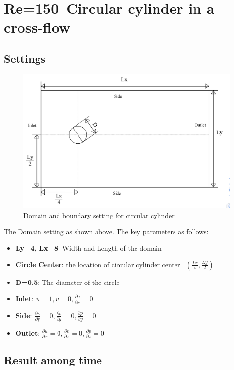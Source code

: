 \documentclass[12pt]{article}
\begin{document}
\newpage
\section{Re=150--Circular cylinder in a cross-flow}
\subsection{Settings}

\begin{figure}[H]
    \centering
    \includegraphics[width=0.6\linewidth]{figure/Solver and Stting/Cylinder_Setting.jpg}
    \caption{Domain and boundary setting for circular cylinder}
\end{figure}

The Domain setting as shown above. The key parameters as follows:
\begin{itemize}
    \item \textbf{Ly=4, Lx=8}: Width and Length of the domain
    \item \textbf{Circle Center}: the location of circular cylinder center=$(\frac{Lx}{4}, \frac{Ly}{2})$
    \item  \textbf{D=0.5}: The diameter of the circle

    \item \textbf{Inlet}: $u=1, v=0, \frac{\partial p}{\partial x}=0$
    \item \textbf{Side}: $\frac{\partial u}{\partial y}=0, \frac{\partial v}{\partial y}=0, 
    \frac{\partial p}{\partial y}=0$
    \item \textbf{Outlet}: $\frac{\partial u}{\partial x}=0, \frac{\partial v}{\partial x}=0, 
    \frac{\partial p}{\partial x}=0$
\end{itemize}







\subsection{Result among time}
\end{document}
